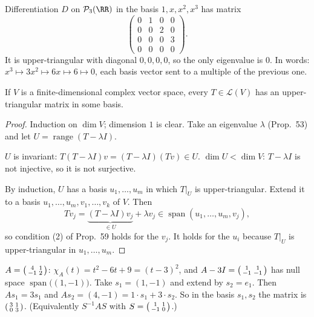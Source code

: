 \documentclass[10pt]{scrartcl}
\DeclareMathOperator{\range}{range}
\DeclareMathOperator{\spn}{span}
\newcommand{\LL}{\mathcal L}
\newcommand{\PP}{\mathcal P}
\begin{document}
\begin{example*}[Ex.~54]
  Differentiation $D$ on $\PP_3(\RR)$ in the basis $1,x,x^2,x^3$ has matrix
  \[ \begin{pmatrix}0&1&0&0\\0&0&2&0\\0&0&0&3\\0&0&0&0\end{pmatrix}. \]
  It is upper-triangular with diagonal $0,0,0,0$, so the only eigenvalue is $0$. In words: $x^3\mapsto3x^2\mapsto6x\mapsto6\mapsto0$, each basis vector sent to a multiple of the previous one.
\end{example*}

\begin{theorem*}
  If $V$ is a finite-dimensional complex vector space, every $T\in\LL(V)$ has an upper-triangular matrix in some basis.
\end{theorem*}
\begin{proof}
  Induction on $\dim V$; dimension $1$ is clear. Take an eigenvalue $\lambda$ (Prop.~53) and let $U=\range(T-\lambda I)$.
  \begin{itemize}
    \ii $U$ is invariant: $T(T-\lambda I)v=(T-\lambda I)(Tv)\in U$.
    \ii $\dim U<\dim V$: $T-\lambda I$ is not injective, so it is not surjective.
  \end{itemize}
  By induction, $U$ has a basis $u_1,\dots,u_m$ in which $T|_U$ is upper-triangular. Extend it to a basis $u_1,\dots,u_m,v_1,\dots,v_k$ of $V$. Then
  \[ Tv_j=\underbrace{(T-\lambda I)v_j}_{\in U}+\lambda v_j\in\spn(u_1,\dots,u_m,v_j), \]
  so condition (2) of Prop.~59 holds for the $v_j$. It holds for the $u_i$ because $T|_U$ is upper-triangular in $u_1,\dots,u_m$.
\end{proof}

\begin{example*}
  $A=\begin{psmallmatrix}4&1\\-1&2\end{psmallmatrix}$: $\chi_A(t)=t^2-6t+9=(t-3)^2$, and $A-3I=\begin{psmallmatrix}1&1\\-1&-1\end{psmallmatrix}$ has null space $\spn\big((1,-1)\big)$. Take $s_1=(1,-1)$ and extend by $s_2=e_1$. Then $As_1=3s_1$ and $As_2=(4,-1)=1\cdot s_1+3\cdot s_2$. So in the basis $s_1,s_2$ the matrix is $\begin{psmallmatrix}3&1\\0&3\end{psmallmatrix}$. (Equivalently $S^{-1}AS$ with $S=\begin{psmallmatrix}1&1\\-1&0\end{psmallmatrix}$.)
\end{example*}
\end{document}
